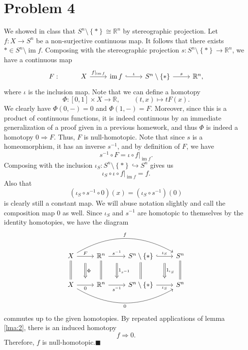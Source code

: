 \documentclass[11pt, letterpaper]{article}
\DeclareMathOperator{\im}{im}
\begin{document}
\section*{Problem 4}
We showed in class that $S^n\setminus \left\{ * \right\} \cong \mathbb{R} ^n$ by stereographic projection. Let $f : X \to S^n$ be a non-surjective continuous map. It follows that there exists $*\in S^n\setminus \im f$. Composing with the stereographic projection $s : S^n\setminus \left\{ * \right\}  \to \mathbb{R} ^n$, we have a continuous map
\[\begin{tikzcd}[row sep = 2.5em, column sep = 2.5em]
	F:&X\ar[" f|_{\im f} ", r]  & \im f\ar[" \iota  ", hook, r]  & S^n\setminus \left\{ * \right\} \ar[" s ", r]  & \mathbb{R} ^n,
\end{tikzcd}\]
where $\iota $ is the inclusion map. Note that we can define a homotopy
\[
	\Phi : [0,1]\times X \to \mathbb{R} ,\qquad (t,x)\mapsto tF(x)
.\]
We clearly have $\Phi (0,-)=0$ and $\Phi (1,-)=F$. Moreover, since this is a product of continuous functions, it is indeed continuous by an immediate generalization of a proof given in a previous homework, and thus $\Phi $ is indeed a homotopy $0\Rightarrow F$. Thus, $F$ is null-homotopic. Note that since $s$ is a homeomorphism, it has an inverse $s ^{-1} $, and by definition of $F$, we have
\[
	s ^{-1} \circ F=\iota \circ f|_{\im f} 
.\]
Composing with the inclusion $\iota_S : S^n\setminus \left\{ * \right\} \hookrightarrow S^n$ gives us
\[
	\iota _S\circ \iota \circ f|_{\im f} =f
.\]
Also that
\[
	(\iota_S \circ s ^{-1} \circ 0)(x)=(\iota _S \circ s ^{-1} )(0)
\]
is clearly still a constant map. We will abuse notation slightly and call the composition map 0 as well. Since $\iota _S$ and $s ^{-1} $ are homotopic to themselves by the identity homotopies, we have the diagram
\[\begin{tikzcd}[row sep = 2.5em, column sep = 2.5em]
	X\ar[" F "{name=F}, r] \ar[" f ", bend left, rrr] \ar[equals, d]  & \mathbb{R} ^n\ar[" s ^{-1}  "{name=s1}, r] \ar[equals, d]  & S^n\setminus \left\{ * \right\} \ar[" \iota _S "{name=i1}, hook, r] \ar[equals, d]  & S^n\ar[equals, d] \\
	X\ar[" 0 "'{name=owo}, r] \ar[" 0 "', bend right, rrr]  & \mathbb{R} ^n\ar[" s ^{-1}  "'{name=s2}, r]  & S^n\setminus \left\{ * \right\} \ar[" \iota _S "'{name=i2}, r]  & S^n
	\arrow[from=F, to=owo, Rightarrow, " \Phi  ", shorten=10px]
	\arrow[from=s1, to=s2, Rightarrow, " 1_{s ^{-1} }  ", shorten=10px]
	\arrow[from=i1, to=i2, Rightarrow, " 1_{\iota _S}  ", shorten=10px]
\end{tikzcd}\]
commutes up to the given homotopies. By repeated applications of lemma \ref{lma:2}, there is an induced homotopy
\[
	f\Rightarrow 0
.\]
Therefore, $f$ is null-homotopic.\hfill$\blacksquare$
\end{document}
